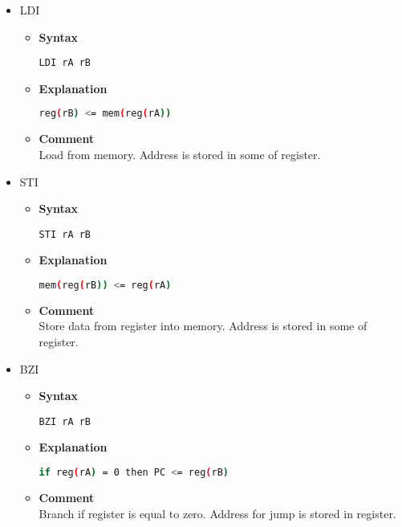 \begin{itemize}
    \item LDI
    \begin{itemize}
        \item \textbf{Syntax}
        \begin{lstlisting}[language={[x86masm]Assembler}, frame=single]
    LDI rA rB
        \end{lstlisting}
        \item \textbf{Explanation}
        \begin{lstlisting}[language=bash, frame=single]
    reg(rB) <= mem(reg(rA))
        \end{lstlisting}
        \item \textbf{Comment} \\
    Load from memory. Address is stored in some of register.
    \end{itemize}

    \item STI
    \begin{itemize}
        \item \textbf{Syntax}
        \begin{lstlisting}[language={[x86masm]Assembler}, frame=single]
    STI rA rB
        \end{lstlisting}
        \item \textbf{Explanation}
        \begin{lstlisting}[language=bash, frame=single]
    mem(reg(rB)) <= reg(rA)
        \end{lstlisting}
        \item \textbf{Comment} \\
    Store data from register into memory. Address is stored in some of register.
    \end{itemize}

    \item BZI
    \begin{itemize}
        \item \textbf{Syntax}
        \begin{lstlisting}[language={[x86masm]Assembler}, frame=single]
    BZI rA rB
        \end{lstlisting}
        \item \textbf{Explanation}
        \begin{lstlisting}[language=bash, frame=single]
    if reg(rA) = 0 then PC <= reg(rB)
        \end{lstlisting}
        \item \textbf{Comment} \\
    Branch if register is equal to zero. Address for jump is stored in register.
    \end{itemize}


\end{itemize}

